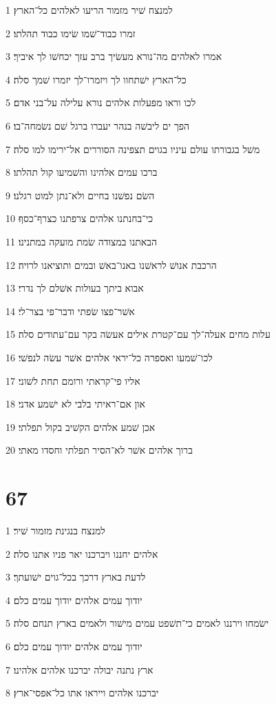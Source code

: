 \par 1 למנצח שׁיר מזמור הריעו לאלהים כל־הארץ׃
\par 2 זמרו כבוד־שׁמו שׂימו כבוד תהלתו׃
\par 3 אמרו לאלהים מה־נורא מעשׂיך ברב עזך יכחשׁו לך איביך׃
\par 4 כל־הארץ ישׁתחוו לך ויזמרו־לך יזמרו שׁמך סלה׃
\par 5 לכו וראו מפעלות אלהים נורא עלילה על־בני אדם׃
\par 6 הפך ים ליבשׁה בנהר יעברו ברגל שׁם נשׂמחה־בו׃
\par 7 משׁל בגבורתו עולם עיניו בגוים תצפינה הסוררים אל־ירימו למו סלה׃
\par 8 ברכו עמים אלהינו והשׁמיעו קול תהלתו׃
\par 9 השׂם נפשׁנו בחיים ולא־נתן למוט רגלנו׃
\par 10 כי־בחנתנו אלהים צרפתנו כצרף־כסף׃
\par 11 הבאתנו במצודה שׂמת מועקה במתנינו׃
\par 12 הרכבת אנושׁ לראשׁנו באנו־באשׁ ובמים ותוציאנו לרויה׃
\par 13 אבוא ביתך בעולות אשׁלם לך נדרי׃
\par 14 אשׁר־פצו שׂפתי ודבר־פי בצר־לי׃
\par 15 עלות מחים אעלה־לך עם־קטרת אילים אעשׂה בקר עם־עתודים סלה׃
\par 16 לכו־שׁמעו ואספרה כל־יראי אלהים אשׁר עשׂה לנפשׁי׃
\par 17 אליו פי־קראתי ורומם תחת לשׁוני׃
\par 18 און אם־ראיתי בלבי לא ישׁמע אדני׃
\par 19 אכן שׁמע אלהים הקשׁיב בקול תפלתי׃
\par 20 ברוך אלהים אשׁר לא־הסיר תפלתי וחסדו מאתי׃

\chapter{67}

\par 1 למנצח בנגינת מזמור שׁיר׃
\par 2 אלהים יחננו ויברכנו יאר פניו אתנו סלה׃
\par 3 לדעת בארץ דרכך בכל־גוים ישׁועתך׃
\par 4 יודוך עמים אלהים יודוך עמים כלם׃
\par 5 ישׂמחו וירננו לאמים כי־תשׁפט עמים מישׁור ולאמים בארץ תנחם סלה׃
\par 6 יודוך עמים אלהים יודוך עמים כלם׃
\par 7 ארץ נתנה יבולה יברכנו אלהים אלהינו׃
\par 8 יברכנו אלהים וייראו אתו כל־אפסי־ארץ׃

